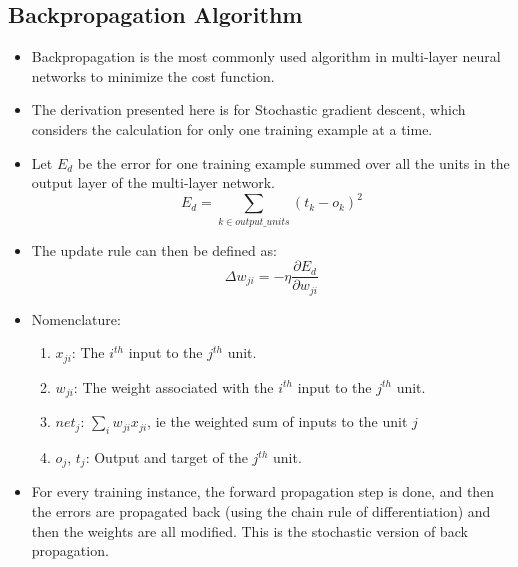 \documentclass{article}
\theoremstyle{plain}
\theoremstyle{definition}
\begin{document}
\subsection{Backpropagation Algorithm}
\begin{itemize}
    \item Backpropagation is the most commonly used algorithm in multi-layer neural networks to minimize the cost function. 
    
    \item The derivation presented here is for Stochastic gradient descent, which considers the calculation for only one training example at a time. 
    
    \item Let $E_d$ be the error for one training example summed over all the units in the output layer of the multi-layer network.
    \begin{equation*}
        E_d = \sum_{k \in output\_units} (t_k - o_k)^2
    \end{equation*}
    
    \item The update rule can then be defined as:
    \begin{equation}
        \Delta w_{ji} = - \eta \frac{\partial E_d}{\partial w_{ji}}
    \end{equation}
    
    \item Nomenclature:
    \begin{enumerate}
        \item $x_{ji}$: The $i^{th}$ input to the $j^{th}$ unit. 
        
        \item $w_{ji}$: The weight associated with the $i^{th}$ input to the $j^{th}$ unit. 
        
        \item $net_j$: $\sum_{i} w_{ji}x_{ji}$, ie the weighted sum of inputs to the unit $j$
        
        \item $o_j$, $t_j$: Output and target of the $j^{th}$ unit. 
    \end{enumerate}
    
    \item For every training instance, the forward propagation step is done, and then the errors are propagated back (using the chain rule of differentiation) and then the weights are all modified. This is the stochastic version of back propagation. 
\end{itemize}
\end{document}
